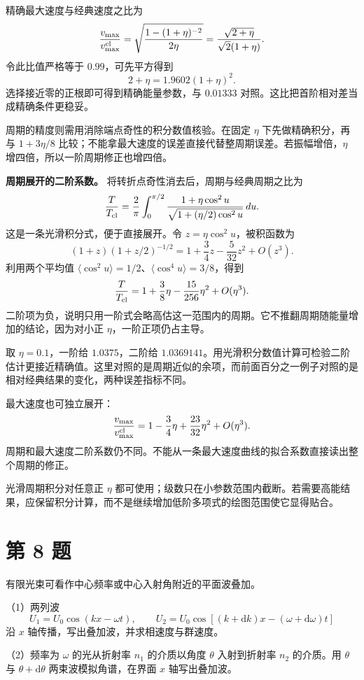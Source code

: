 \documentclass[12pt,a4paper,UTF8]{ctexart}
\begin{document}
精确最大速度与经典速度之比为 \[
\frac{v_{\max}}{v_{\max}^{\rm cl}}
=\sqrt{\frac{1-(1+\eta)^{-2}}{2\eta}}
=\frac{\sqrt{2+\eta}}{\sqrt2(1+\eta)}.
\] 令此比值严格等于 \(0.99\)，可先平方得到 \[
2+\eta=1.9602(1+\eta)^2.
\] 选择接近零的正根即可得到精确能量参数，与 \(0.01333\)
对照。这比把首阶相对差当成精确条件更稳妥。

周期的精度则需用消除端点奇性的积分数值核验。在固定 \(\eta\)
下先做精确积分，再与 \(1+3\eta/8\)
比较；不能拿最大速度的误差直接代替整周期误差。若振幅增倍，\(\eta\)
增四倍，所以一阶周期修正也增四倍。

\textbf{周期展开的二阶系数。} 将转折点奇性消去后，周期与经典周期之比为
\[
\frac{T}{T_{\rm cl}}=\frac2\pi\int_0^{\pi/2}
\frac{1+\eta\cos^2u}{\sqrt{1+(\eta/2)\cos^2u}}\,du.
\] 这是一条光滑积分式，便于直接展开。令 \(z=\eta\cos^2u\)，被积函数为 \[
(1+z)(1+z/2)^{-1/2}
=1+\frac34z-\frac5{32}z^2+O(z^3).
\] 利用两个平均值
\(\langle\cos^2u\rangle=1/2\)、\(\langle\cos^4u\rangle=3/8\)，得到 \[
\frac{T}{T_{\rm cl}}=1+\frac38\eta-\frac{15}{256}\eta^2+O(\eta^3).
\]
二阶项为负，说明只用一阶式会略高估这一范围内的周期。它不推翻周期随能量增加的结论，因为对小正
\(\eta\)，一阶正项仍占主导。

取 \(\eta=0.1\)，一阶给 \(1.0375\)，二阶给
\(1.0369141\)。用光滑积分数值计算可检验二阶估计更接近精确值。这里对照的是周期近似的余项，而前面百分之一例子对照的是相对经典结果的变化，两种误差指标不同。

最大速度也可独立展开： \[
\frac{v_{\max}}{v_{\max}^{\rm cl}}
=1-\frac34\eta+\frac{23}{32}\eta^2+O(\eta^3).
\]
周期和最大速度二阶系数仍不同。不能从一条最大速度曲线的拟合系数直接读出整个周期的修正。

光滑周期积分对任意正 \(\eta\)
都可使用；级数只在小参数范围内截断。若需要高能结果，应保留积分计算，而不是继续增加低阶多项式的绘图范围使它显得贴合。

\newpage

\section{第 8 题}\label{ux7b2c-8-ux9898}

有限光束可看作中心频率或中心入射角附近的平面波叠加。

（1）两列波 \[
U_1=U_0\cos(kx-\omega t),\qquad
U_2=U_0\cos[(k+\mathrm dk)x-(\omega+\mathrm d\omega)t]
\] 沿 \(x\) 轴传播，写出叠加波，并求相速度与群速度。

（2）频率为 \(\omega\) 的光从折射率 \(n_1\) 的介质以角度 \(\theta\)
入射到折射率 \(n_2\) 的介质。用 \(\theta\) 与 \(\theta+\mathrm d\theta\)
两束波模拟角谱，在界面 \(x\) 轴写出叠加波。
\end{document}
